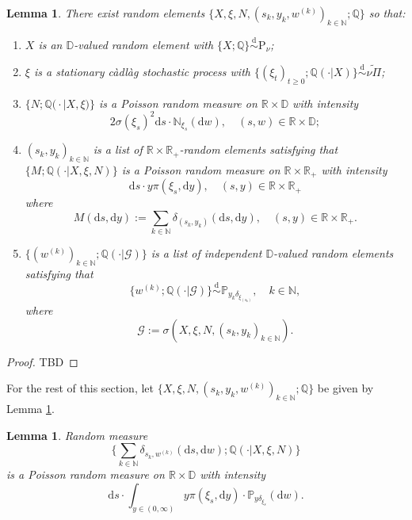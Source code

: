 \documentclass[12pt,a4paper]{amsart}
\numberwithin{equation}{section}
\theoremstyle{plain}
\newtheorem{lem}[thm]{Lemma}
\theoremstyle{definition}
\theoremstyle{remark}
\begin{document}
\begin{lem}  \label{thm:E.16}
	There exist random elements $\big\{X, \xi, N, (s_k, y_k,w^{(k)})_{k\in \mathbb N}; \mathbb Q\big\}$ so that:
\begin{enumerate}
\item
	$X$ is an $\mathbb D$-valued random element with $\{X; \mathbb Q\} \overset{\text{d}} \sim \mathrm P_\nu$;
\item
	$\xi$ is a stationary c\`adl\`ag stochastic process with $\{(\xi_t)_{t \geq 0}; \mathbb Q(\cdot | X)\} \overset{\text{d}} \sim \widetilde{\nu \Pi}$;
\item
	$\big\{N; \mathbb Q\big(\cdot \big|X,\xi\big)\big\}$ is a Poisson random measure on $\mathbb R\times \mathbb D$ with intensity 
\[
	2 \sigma(\xi_s)^2 {\mathrm d}s \cdot \mathbb N_{\xi_s}({\mathrm d}w), 
	\quad (s,w)\in \mathbb R\times \mathbb D;
\]
\item
	$(s_k, y_k)_{k\in \mathbb N}$ is a list of $\mathbb R \times \mathbb R_+$-random elements satisfying that $\{M; \mathbb Q(\cdot | X, \xi, N)\}$ is a Poisson random measure on $\mathbb R \times \mathbb R_+$ with intensity
\[
	\mathrm ds \cdot y \pi(\xi_s, \mathrm dy), \quad (s,y)\in \mathbb R \times \mathbb R_+
\]
	where
\[
	M(\mathrm ds,\mathrm dy) 
	:= \sum_{k\in \mathbb N} \delta_{(s_k, y_k)}(\mathrm ds,\mathrm dy), \quad (s,y)\in \mathbb R \times \mathbb R_+.
\]
\item 
	$\{(w^{(k)})_{k\in \mathbb N}; \mathbb Q(\cdot|\mathscr G)\}$ is a list of independent $\mathbb D$-valued random elements satisfying that 
\[
	\{w^{(k)}; \mathbb Q(\cdot| \mathscr G)\} 
	\overset{\text{d}}\sim \mathbb P_{y_k\delta_{\xi_{(s_k)}}}, 
	\quad k\in \mathbb N,
\]
	where
\[
	\mathscr G 
	:= \sigma(X, \xi, N, (s_k, y_k)_{k\in \mathbb N}). 
\]
\end{enumerate}
\end{lem}
\begin{proof}
	TBD
\end{proof}
	For the rest of this section, let $\big\{X, \xi, N, (s_k, y_k,w^{(k)})_{k\in \mathbb N}; \mathbb Q\big\}$ be given by Lemma \ref{thm:E.16}.
\begin{lem} \label{thm:E.19}
	Random measure
\[
	\Big\{\sum_{k\in \mathbb N} \delta_{s_k, w^{(k)}}(\mathrm ds,\mathrm dw); \mathbb Q(\cdot | X, \xi, N)\Big\}
\]
	is a Poisson random measure on $\mathbb R \times \mathbb D$ with intensity
\[
	\mathrm ds \cdot \int_{y\in (0,\infty)} y \pi(\xi_s, \mathrm dy)\cdot \mathbb P_{y\delta_{\xi_s}}(\mathrm dw).
\]
\end{lem}
\end{document}
